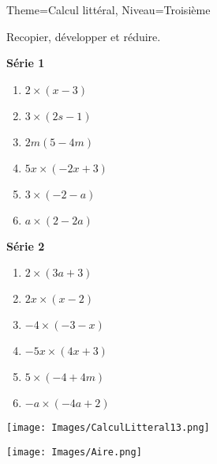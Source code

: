 \documentclass[11pt]{article}
\begin{document}
\begin{multicols}{2}
\begin{Maquette}[Fiche]{Theme=Calcul littéral, Niveau=Troisième}
        \begin{exercice}
            Recopier, développer et réduire.
            \begin{multicols}{2}
                \textbf{Série 1}
                \begin{enumerate}[label=\textbf{\alph*.}]
                    \item $ 2 \times \left( x-3 \right) $
                    \item $ 3 \times \left( 2s-1 \right) $
                    \item $ 2m \left( 5-4m \right) $
                    \item $ 5x \times \left( -2x+3 \right) $
                    \item $ 3 \times \left( -2-a \right) $
                    \item $ a \times \left( 2-2a \right) $
                \end{enumerate}
                \textbf{Série 2}
                \begin{enumerate}[label=\textbf{\alph*.}]
                    \item $ 2 \times \left( 3a+3 \right) $
                    \item $ 2x \times \left( x-2 \right) $
                    \item $ -4 \times \left( -3-x \right) $
                    \item $ -5x \times \left( 4x+3 \right) $
                    \item $ 5 \times \left( -4+4m \right) $
                    \item $ -a \times \left( -4a+2 \right) $
                \end{enumerate}
            \end{multicols}
        \end{exercice}

        \newpage

        \begin{exercice}
            \begin{center}
                \texttt{[image: Images/CalculLitteral13.png]}
            \end{center}
        \end{exercice}

        \begin{exercice}
            \begin{center}
                \texttt{[image: Images/Aire.png]}
            \end{center}


\end{exercice}
\end{Maquette}
\end{multicols}
\end{document}
